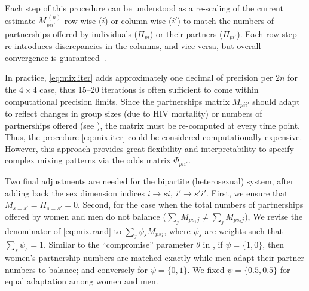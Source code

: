 Each step of this procedure can be understood as
a re-scaling of the current estimate $M_{pii'}^{\,(n)}$
row-wise ($i$) or column-wise ($i'$) to match the numbers of partnerships
offered by individuals ($\Pi_{pi}$) or their partners ($\Pi_{pi'}$).
Each row-step re-introduces discrepancies in the columns, and vice versa,
but overall convergence is guaranteed~\cite{Sinkhorn1964}.
\par
In practice, \eqref{eq:mix.iter} adds approximately
one decimal of precision per $2n$ for the $4\times4$ case,
thus 15--20 iterations is often sufficient to come within computational precision limits.
Since the partnerships matrix $M_{pii'}$ should adapt to reflect changes in
group sizes (\eg due to HIV mortality) or
numbers of partnerships offered (\eg see ),
the matrix must be re-computed at every time point.
Thus, the procedure \eqref{eq:mix.iter} could be considered computationally expensive.
However, this approach provides great flexibility and interpretability
to specify complex mixing patterns via the odds matrix $\Phi_{pii'}$.
\par
Two final adjustments are needed for the bipartite (\ie heterosexual) system,
after adding back the sex dimension indices $i \rightarrow si, ~ i' \rightarrow s'i'$.
First, we ensure that $M_{s=s'} = \Pi_{s=s'} = 0$.
Second, for the case when the total numbers of partnerships offered by women and men
do not balance ($\sum_j M_{ps_{1}j} \ne \sum_j M_{ps_{2}j}$),
We revise the denominator of \eqref{eq:mix.rand} to $\sum_{j} \psi_s M_{psj}$,
where $\psi_s$ are weights such that $\sum_s \psi_s = 1$.
Similar to the ``compromise'' parameter $\theta$ in \cite{Garnett1994},
if $\psi = \{1,0\}$, then women's partnership numbers are matched exactly
while men adapt their partner numbers to balance;
and conversely for $\psi = \{0,1\}$.
We fixed $\psi = \{0.5,0.5\}$ for equal adaptation among women and men.
